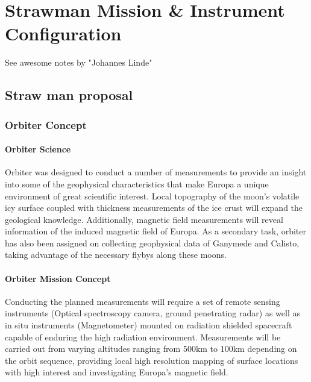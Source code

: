 \chapter{Strawman Mission \& Instrument Configuration} %

See awesome notes by "Johannes Linde"

\section{Straw man proposal}

\subsection{Orbiter Concept}

\subsubsection{Orbiter Science}
Orbiter was designed to conduct a number of measurements to provide an insight into some of the geophysical characteristics that make Europa a unique environment of great scientific interest. Local topography of the moon’s volatile icy surface coupled with thickness measurements of the ice crust will expand the geological knowledge. Additionally, magnetic field measurements will reveal information of the induced magnetic field of Europa. As a secondary task, orbiter has also been assigned on collecting geophysical data of Ganymede and Calisto, taking advantage of the necessary flybys along these moons.

\subsubsection{Orbiter Mission Concept}

Conducting the planned measurements will require a set of remote sensing instruments (Optical spectroscopy camera, ground penetrating radar) as well as in situ instruments (Magnetometer) mounted on radiation shielded spacecraft capable of enduring the high radiation environment. Measurements will be carried out from varying altitudes ranging from 500km to 100km depending on the orbit sequence, providing local high resolution mapping of surface locations with high interest and investigating Europa’s magnetic field. 

